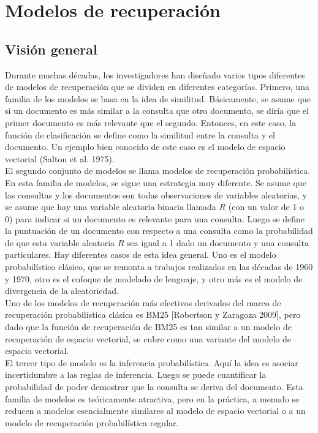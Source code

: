 \chapter{Modelos de recuperación}\label{Chapter4} 

\section{Visión general}

Durante muchas décadas, los investigadores han diseñado varios tipos diferentes de modelos de recuperación que se dividen en diferentes categorías. Primero, una familia de los modelos se basa en la idea de similitud. Básicamente, se asume que si un documento es más similar a la consulta que otro documento, se diría que el primer documento es más relevante que el segundo. Entonces, en este caso, la función de clasificación se define como la similitud entre la consulta y el documento. Un ejemplo bien conocido de este caso es el modelo de espacio vectorial (Salton et al. 1975). \\

El segundo conjunto de modelos se llama modelos de recuperación probabilística. En esta familia de modelos, se sigue una estrategia muy diferente. Se asume que las consultas y los documentos son todas observaciones de variables aleatorias, y se asume que hay una variable aleatoria binaria llamada $R$ (con un valor de 1 o 0) para indicar si un documento es relevante para una consulta. Luego se define la puntuación de un documento con respecto a una consulta como la probabilidad de que esta variable aleatoria $R$ sea igual a 1 dado un documento y una consulta particulares. Hay diferentes casos de esta idea general. Uno es el modelo probabilístico clásico, que se remonta a trabajos realizados en las décadas de 1960 y 1970, otro es el enfoque de modelado de lenguaje, y otro más es el modelo de divergencia de la aleatoriedad. \\

Uno de los modelos de recuperación más efectivos derivados del marco de recuperación probabilística clásica es BM25 [Robertson y Zaragoza 2009], pero dado que la función de recuperación de BM25 es tan similar a un modelo de recuperación de espacio vectorial, se cubre como una variante del modelo de espacio vectorial. \\

El tercer tipo de modelo es la inferencia probabilística. Aquí la idea es asociar incertidumbre a las reglas de inferencia. Luego se puede cuantificar la probabilidad de poder demostrar que la consulta se deriva del documento. Esta familia de modelos es teóricamente atractiva, pero en la práctica, a menudo se reducen a modelos esencialmente similares al modelo de espacio vectorial o a un modelo de recuperación probabilística regular. \\

